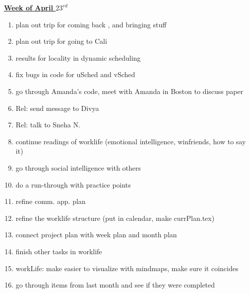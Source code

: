 \underline{\textbf{Week of April $23^{rd}$}} \\
\begin{enumerate}

\item plan out trip for coming back , and bringing stuff
\item plan out trip for going to Cali

\item results for locality in dynamic scheduling \\
\item fix bugs in code for uSched and vSched \\
\item go through Amanda's code, meet with Amanda in Boston to discuss paper \\

\item Rel: send message to Divya 
\item Rel: talk to Sneha N.  

\item continue readings of worklife (emotional intelligence, winfriends, how to say it) \\
\item go through social intelligence with others \\

\item do a run-through with practice points \\
\item refine comm. app. plan \\
\item refine the worklife structure (put in calendar, make currPlan.tex) \\
\item connect project plan with week plan and month plan \\
\item finish other tasks in worklife \\
\item workLife: make easier to visualize with mindmaps, make sure it coincides \\
\item go through items from last month and see if they were completed \\
\end{enumerate}

